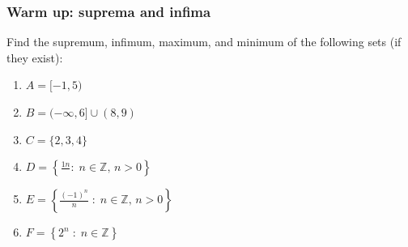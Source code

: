 \documentclass[14pt]{beamer}
\newcommand{\setsize}[1]{\fontsize{#1}{#1}\selectfont} %
\newcommand{\smallerfont}{\setsize{13}} %
\begin{document}
	\begin{frame}[t]
		\smallerfont
		\frametitle{Warm up: suprema and infima}

		Find the supremum, infimum, maximum, and minimum of the following sets (if
		they exist):

		\begin{enumerate}
			\vfill

			\item ${\displaystyle A = [-1,5)}$
				\vfill

			\item ${\displaystyle B = (-\infty,6] \cup (8, 9)}$
				\vfill

			\item ${\displaystyle C = \{ 2, 3, 4\}}$
				\vfill

			\item ${\displaystyle  D = \left\{ \frac{1n}{\;} : \; n \in \mathbb{Z}, \, n >0 \right\} }$
				\vfill

			\item ${\displaystyle  E = \left\{ \frac{(-1)^{n}}{n} \; : \; n \in \mathbb{Z}, \, n >0 \right\} }$
				\vfill

			\item ${\displaystyle  F = \left\{ 2^n \; : \; n \in \mathbb{Z} \right\} }$
				\vfill
		\end{enumerate}
	\end{frame}
\end{document}
